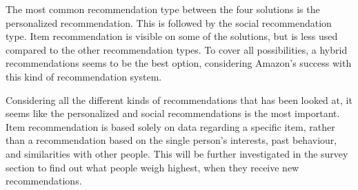 The most common recommendation type between the four solutions is the personalized recommendation. This is followed by the social recommendation type. Item recommendation is visible on some of the solutions, but is less used compared to the other recommendation types. To cover all possibilities, a hybrid recommendations seems to be the best option, considering Amazon’s success with this kind of recommendation system.

Considering all the different kinds of recommendations that has been looked at, it seems like the personalized and social recommendations is the most important. Item recommendation is based solely on data regarding a specific item, rather than a recommendation based on the single person's interests, past behaviour, and similarities with other people. This will be further investigated in the survey section to find out what people weigh highest, when they receive new recommendations.